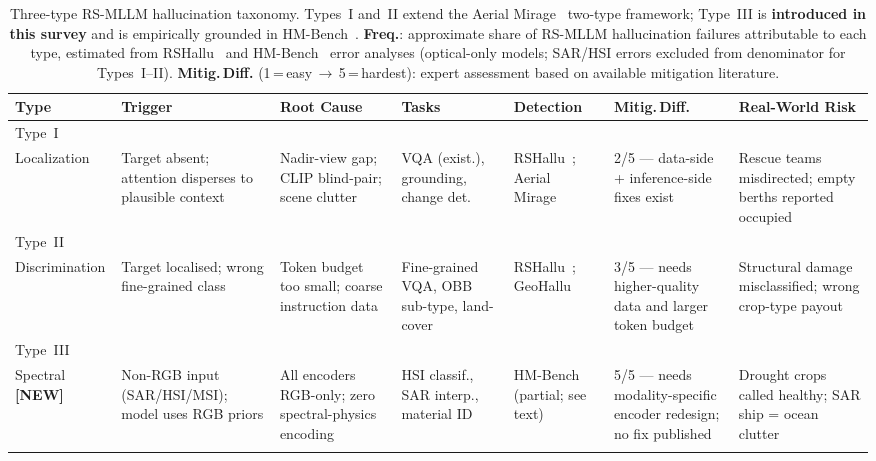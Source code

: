 \begin{table}[t]
\caption{Three-type RS-MLLM hallucination taxonomy. Types~I and~II extend the
Aerial Mirage~\cite{aerialmirage2026} two-type framework; Type~III is
\textbf{introduced in this survey} and is empirically grounded in
HM-Bench~\cite{hmbench2026}. \textbf{Freq.}: approximate share of RS-MLLM
hallucination failures attributable to each type, estimated from
RSHallu~\cite{rshallu2026} and HM-Bench~\cite{hmbench2026} error analyses
(optical-only models; SAR/HSI errors excluded from denominator for Types~I--II).
\textbf{Mitig.\,Diff.} (1\,=\,easy\,$\to$\,5\,=\,hardest): expert assessment
based on available mitigation literature.}\label{tab:hall_taxonomy}
\tiny\setlength\tabcolsep{2pt}
\begin{tabular*}{\textwidth}{@{\extracolsep\fill}p{1.2cm}p{2.1cm}p{2.0cm}p{1.8cm}p{1.5cm}p{2.0cm}p{2.3cm}}
\toprule
\textbf{Type} &
\textbf{Trigger} &
\textbf{Root Cause} &
\textbf{Tasks} &
\textbf{Detection} &
\textbf{Mitig.\,Diff.} &
\textbf{Real-World Risk} \\
\midrule
Type~I\\Localization
  & Target absent; attention disperses to plausible context
  & Nadir-view gap; CLIP blind-pair; scene clutter
  & VQA (exist.), grounding, change det.
  & RSHallu~\cite{rshallu2026}; Aerial Mirage~\cite{aerialmirage2026}
  & 2/5 — data-side + inference-side fixes exist~\cite{ddfav2025,seeingclearly2026}
  & Rescue teams misdirected; empty berths reported occupied \\[4pt]
Type~II\\Discrimination
  & Target localised; wrong fine-grained class
  & Token budget too small; coarse instruction data
  & Fine-grained VQA, OBB sub-type, land-cover
  & RSHallu~\cite{rshallu2026}; GeoHallu~\cite{geohallu2026}
  & 3/5 — needs higher-quality data and larger token budget
  & Structural damage misclassified; wrong crop-type payout \\[4pt]
Type~III\\Spectral \textbf{[NEW]}
  & Non-RGB input (SAR/HSI/MSI); model uses RGB priors
  & All encoders RGB-only; zero spectral-physics encoding
  & HSI classif., SAR interp., material ID
  & HM-Bench~\cite{hmbench2026} (partial; see text)
  & 5/5 — needs modality-specific encoder redesign; no fix published
  & Drought crops called healthy; SAR ship = ocean clutter \\
\botrule
\end{tabular*}
\end{table}

